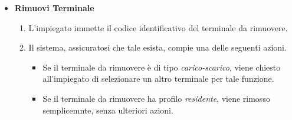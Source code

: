 \documentclass[12pt, letterpaper]{article}
\begin{document}
\begin{itemize}
    \begin{itemize}
        \item \textbf{Rimuovi Terminale}
        \begin{enumerate}
            \item L'impiegato immette il codice 
            identificativo del terminale da 
            rimuovere.
            \item Il sistema, assicuratosi che tale 
            esista, compie una delle seguenti azioni.
            \begin{itemize}
                \item Se il terminale da rimuovere 
                è di tipo \emph{carico-scarico}, 
                viene chiesto all'impiegato di 
                selezionare un altro terminale per 
                tale funzione.
                \item Se il terminale da rimuovere 
                ha profilo \emph{residente}, viene 
                rimosso semplicemnte, senza 
                ulteriori azioni.
            \end{itemize}
        \end{enumerate}
    \end{itemize}
\end{itemize}
\end{document}
